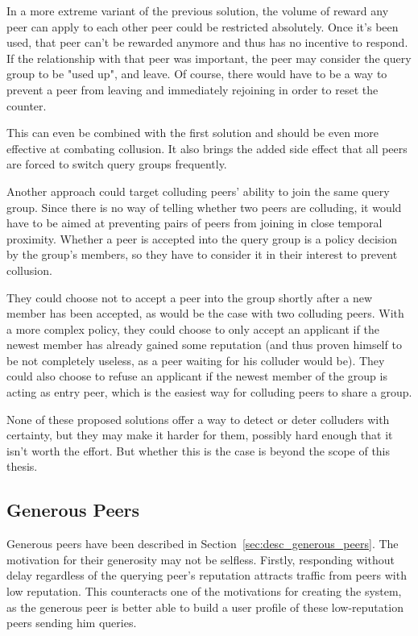In a more extreme variant of the previous solution, the volume of reward any
peer can apply to each other peer could be restricted absolutely. Once it's been
used, that peer can't be rewarded anymore and thus has no incentive to respond.
If the relationship with that peer was important, the peer may consider the
query group to be "used up", and leave. Of course, there would have to be a way
to prevent a peer from leaving and immediately rejoining in order to reset the
counter.

This can even be combined with the first solution and should be even more
effective at combating collusion. It also brings the added side effect that all
peers are forced to switch query groups frequently.

Another approach could target colluding peers' ability to join the same query
group. Since there is no way of telling whether two peers are colluding, it
would have to be aimed at preventing pairs of peers from joining in close
temporal proximity. Whether a peer is accepted into the query group is a policy
decision by the group's members, so they have to consider it in their interest
to prevent collusion.

They could choose not to accept a peer into the group shortly after a new member
has been accepted, as would be the case with two colluding peers. With a more
complex policy, they could choose to only accept an applicant if the newest
member has already gained some reputation (and thus proven himself to be not
completely useless, as a peer waiting for his colluder would be). They could
also choose to refuse an applicant if the newest member of the group is acting
as entry peer, which is the easiest way for colluding peers to share a group.

None of these proposed solutions offer a way to detect or deter colluders with
certainty, but they may make it harder for them, possibly hard enough that it
isn't worth the effort. But whether this is the case is beyond the scope of this
thesis.

\subsection{Generous Peers}
\label{sec:desc_attacks_generous}
Generous peers have been described in Section~\ref{sec:desc_generous_peers}.
The motivation for their generosity may not be selfless. Firstly, responding
without delay regardless of the querying peer's reputation attracts traffic from
peers with low reputation. This counteracts one of the motivations for creating
the system, as the generous peer is better able to build a user profile of these
low-reputation peers sending him queries.

